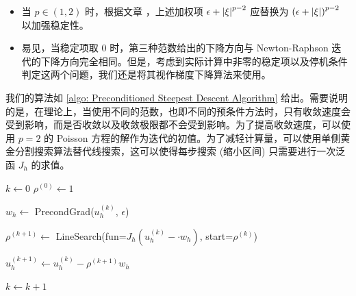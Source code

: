 \begin{remark}
	\begin{itemize}
		\item 当 \(p \in (1,2)\) 时，根据文章 \cite{10.1007/s10915-007-9134-z}，上述加权项 \(\epsilon + \left\lvert\xi\right\rvert^{p-2}\) 应替换为 \(\left(\epsilon + \left\lvert\xi\right\rvert\right)^{p-2}\) 以加强稳定性。
		\item 易见，当稳定项取 \(0\) 时，第三种范数给出的下降方向与 Newton-Raphson 迭代的下降方向完全相同。但是，考虑到实际计算中非零的稳定项以及停机条件判定这两个问题，我们还是将其视作梯度下降算法来使用。
	\end{itemize}
\end{remark}

我们的算法如 \ref{algo: Preconditioned Steepest Descent Algorithm} 给出。需要说明的是，在理论上，当使用不同的范数，也即不同的预条件方法时，只有收敛速度会受到影响，而是否收敛以及收敛极限都不会受到影响。为了提高收敛速度，可以使用 \(p = 2\) 的 Poisson 方程的解作为迭代的初值。为了减轻计算量，可以使用单侧黄金分割搜索算法替代线搜索，这可以使得每步搜索 (缩小区间) 只需要进行一次泛函 \(J_{h}\) 的求值。

\begin{algorithm}[htbp]
	\SetAlgoLined




	\(k \leftarrow 0\) 
	\(\rho^{(0)} \leftarrow 1\) 

	{   
		\(w_{h} \leftarrow\) PrecondGrad(\(u_{h}^{(k)}\), \(\epsilon\)) \;


		\(\rho^{(k+1)} \leftarrow\) LineSearch(fun=\(J_{h}(u_{h}^{(k)} - \cdot w_{h})\), start=\(\rho^{(k)}\)) \;


		\(u_{h}^{(k+1)} \leftarrow u_{h}^{(k)} - \rho^{(k+1)} w_{h}\) \;

		\(k \leftarrow k + 1\) \;
	}
	\caption{Preconditioned Steepest Descent Algorithm}
	\label{algo: Preconditioned Steepest Descent Algorithm}
\end{algorithm}


